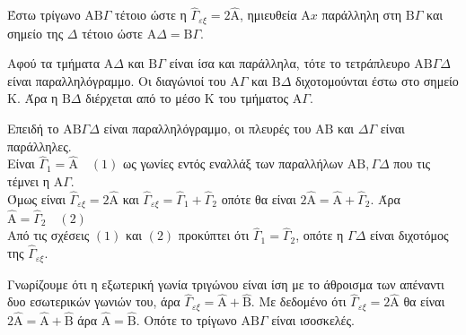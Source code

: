 Έστω τρίγωνο $\mathrm{A}\mathrm{B}\Gamma$ τέτοιο ώστε η $\hat{\Gamma}_{\varepsilon\xi} = 2\hat{\mathrm{A}}$, ημιευθεία $\mathrm{A}x$ παράλληλη στη $\mathrm{B}\Gamma$ και σημείο της $\Delta$ τέτοιο ώστε $\mathrm{A}\Delta = \mathrm{B}\Gamma$.


\begin{alist}
    \item Αφού τα τμήματα $\mathrm{A}\Delta$ και $\mathrm{B}\Gamma$ είναι ίσα και παράλληλα, τότε το τετράπλευρο $\mathrm{A}\mathrm{B}\Gamma\Delta$ είναι παραλληλόγραμμο. Οι διαγώνιοί του $\mathrm{A}\Gamma$ και $\mathrm{B}\Delta$ διχοτομούνται έστω στο σημείο $\mathrm{K}$. Άρα η $\mathrm{B}\Delta$ διέρχεται από το μέσο $\mathrm{K}$ του τμήματος $\mathrm{A}\Gamma$.
    
    \item Επειδή το $\mathrm{A}\mathrm{B}\Gamma\Delta$ είναι παραλληλόγραμμο, οι πλευρές του $\mathrm{A}\mathrm{B}$ και $\Delta\Gamma$ είναι παράλληλες.\\
    Είναι $\hat{\Gamma}_1 = \hat{\mathrm{A}} \quad (1)$ ως γωνίες εντός εναλλάξ των παραλλήλων $\mathrm{A}\mathrm{B}, \Gamma\Delta$ που τις τέμνει η $\mathrm{A}\Gamma$. \\
    Όμως είναι $\hat{\Gamma}_{\varepsilon\xi} = 2\hat{\mathrm{A}}$ και $\hat{\Gamma}_{\varepsilon\xi} = \hat{\Gamma}_1 + \hat{\Gamma}_2$ οπότε θα είναι $2\hat{\mathrm{A}} = \hat{\mathrm{A}} + \hat{\Gamma}_2$. Άρα $\hat{\mathrm{A}} = \hat{\Gamma}_2 \quad (2)$ \\
    Από τις σχέσεις $(1)$ και $(2)$ προκύπτει ότι $\hat{\Gamma}_1 = \hat{\Gamma}_2$, οπότε η $\Gamma\Delta$ είναι διχοτόμος της $\hat{\Gamma}_{\varepsilon\xi}$.
    
    \item Γνωρίζουμε ότι η εξωτερική γωνία τριγώνου είναι ίση με το άθροισμα των απέναντι δυο εσωτερικών γωνιών του, άρα $\hat{\Gamma}_{\varepsilon\xi} = \hat{\mathrm{A}} + \hat{\mathrm{B}}$. Με δεδομένο ότι $\hat{\Gamma}_{\varepsilon\xi} = 2\hat{\mathrm{A}}$ θα είναι $2\hat{\mathrm{A}} = \hat{\mathrm{A}} + \hat{\mathrm{B}}$ άρα $\hat{\mathrm{A}} = \hat{\mathrm{B}}$. Οπότε το τρίγωνο $\mathrm{A}\mathrm{B}\Gamma$ είναι ισοσκελές.
\end{alist}
